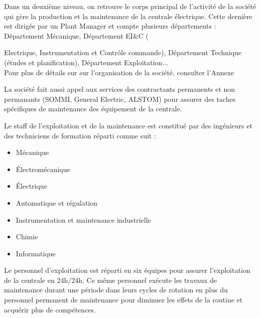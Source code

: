 Dans un deuxième niveau, on retrouve le corps principal de l'activité de la société qui gère la production et la maintenance de la centrale électrique. Cette dernière est dirigée par un Plant Manager  et compte plusieurs départements : Département Mécanique, Département EI\&C ({Electrique, Instrumentation et Contrôle commande), Département Technique (études et planification), Département Exploitation... \\
Pour plus de détails sur  sur l'organisation de la société, consulter l'Annexe \uppercase\expandafter{} 

\begin{comment}
La CPC emploie au total 70 personnes, dont un chef de centrale, deux responsables d'exploitation et de maintenance, six administrateurs.\\Le reste du staff est constitué par des ingénieurs et des techniciens de formation réparti comme suit :
\end{comment}

La société fait aussi appel aux services des contractants permanents et non permanants (SOMMI, General Electric, ALSTOM) pour assurer des taches spécifiques de maintenance des équipement de la centrale.

Le staff de l'exploitation et de la maintenance est constitué par des ingénieurs et des techniciens de formation réparti comme suit :

\begin{itemize}
\item Mécanique
\item Électromécanique
\item Électrique 
\item Automatique et régulation 
\item Instrumentation et maintenance industrielle
\item Chimie
\item Informatique
\end{itemize}


Le personnel d'exploitation est réparti en six équipes pour assurer l'exploitation de la centrale en 24h/24h. Ce même personnel exécute les travaux de maintenance durant une période dans leurs cycles de rotation en plus du personnel permanent de maintenance pour diminuer les effets de la routine et acquérir plus de compétences. 

	\begin{comment}
	
	La CPC est organisée selon une hiérarchie horizontale où tout le monde (ou presque) s'implique lors de la réalisation d'une tâche. En effet, la maintenance est répartie sur toutes les équipes de travail, et tous les responsables s'en occupent ce qui atténue énormément la charge individuelle. 
	\end{comment}
}
